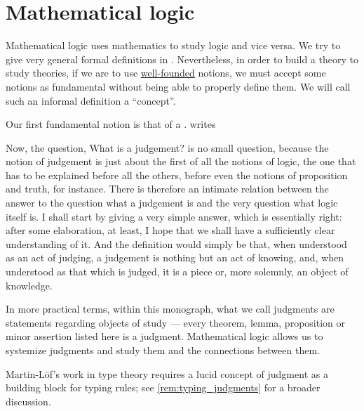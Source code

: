 \chapter{Mathematical logic}\label{ch:mathematical_logic}

Mathematical logic uses mathematics to study logic and vice versa. We try to give very general formal definitions in . Nevertheless, in order to build a theory to study theories, if we are to use \hyperref[def:well_founded_relation]{well-founded} notions, we must accept some notions as fundamental without being able to properly define them. We will call such an informal definition a \enquote{concept}.

\begin{concept}\label{con:judgment}
  Our first fundamental notion is that of a .  writes
  \begin{displayquote}
    Now, the question, What is a judgement? is no small question, because the notion of judgement is just about the first of all the notions of logic, the one that has to be explained before all the others, before even the notions of proposition and truth, for instance. There is therefore an intimate relation between the answer to the question what a judgement is and the very question what logic itself is. I shall start by giving a very simple answer, which is essentially right: after some elaboration, at least, I hope that we shall have a sufficiently clear understanding of it. And the definition would simply be that, when understood as an act of judging, a judgement is nothing but an act of knowing, and, when understood as that which is judged, it is a piece or, more solemnly, an object of knowledge.
  \end{displayquote}
\end{concept}
\begin{comments}
  \item In more practical terms, within this monograph, what we call judgments are statements regarding objects of study --- every theorem, lemma, proposition or minor assertion listed here is a judgment. Mathematical logic allows us to systemize judgments and study them and the connections between them.

  \item Martin-L\"of's work in type theory requires a lucid concept of judgment as a building block for typing rules; see \cref{rem:typing_judgments} for a broader discussion.
\end{comments}

